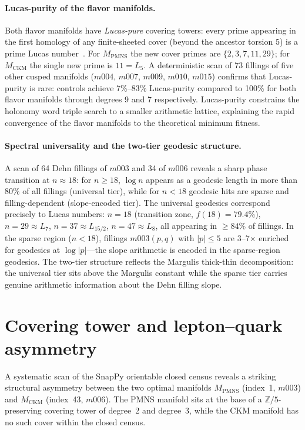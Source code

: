 ﻿\documentclass[12pt]{article}
\theoremstyle{definition}
\begin{document}
\paragraph{Lucas-purity of the flavor manifolds.}
Both flavor manifolds have \emph{Lucas-pure} covering towers: every prime
appearing in the first homology of any finite-sheeted cover (beyond the
ancestor torsion 5) is a prime Lucas number~\cite{Gentry:Lucas}.
For $M_\mathrm{PMNS}$ the new cover primes are $\{2,3,7,11,29\}$;
for $M_\mathrm{CKM}$ the single new prime is $11 = L_5$.
A deterministic scan of 73 fillings of five other cusped manifolds
($m004$, $m007$, $m009$, $m010$, $m015$) confirms that Lucas-purity
is rare: controls achieve 7\%--83\% Lucas-purity compared to 100\%
for both flavor manifolds through degrees 9 and 7 respectively.
Lucas-purity constrains the holonomy word triple search to a smaller
arithmetic lattice, explaining the rapid convergence of the flavor
manifolds to the theoretical minimum fitness.

\paragraph{Spectral universality and the two-tier geodesic structure.}
A scan of 64 Dehn fillings of $m003$ and 34 of $m006$ reveals a sharp
phase transition at $n \approx 18$: for $n \geq 18$, $\log n$ appears
as a geodesic length in more than 80\% of all fillings (universal tier),
while for $n < 18$ geodesic hits are sparse and filling-dependent
(slope-encoded tier). The universal geodesics correspond precisely to
Lucas numbers: $n = 18$ (transition zone, $f(18)=79.4\%$), $n = 29 \approx L_7$,
$n = 37 \approx L_{15/2}$, $n = 47 \approx L_8$, all appearing in
$\geq 84\%$ of fillings. In the sparse region ($n < 18$), fillings
$m003(p,q)$ with $|p| \leq 5$ are 3--7$\times$ enriched for geodesics
at $\log|p|$---the slope arithmetic is encoded in the sparse-region
geodesics. The two-tier structure reflects the Margulis thick-thin
decomposition: the universal tier sits above the Margulis constant
while the sparse tier carries genuine arithmetic information about the
Dehn filling slope.


\section{Covering tower and lepton--quark asymmetry}
\label{sec:covering_tower}

A systematic scan of the SnapPy orientable closed census reveals
a striking structural asymmetry between the two optimal manifolds
$M_\text{PMNS}$ (index~1, $m003$) and $M_\text{CKM}$ (index~43, $m006$).
The PMNS manifold sits at the base of a $\mathbb{Z}/5$-preserving
covering tower of degree~2 and degree~3, while the CKM manifold
has no such cover within the closed census.
\end{document}
